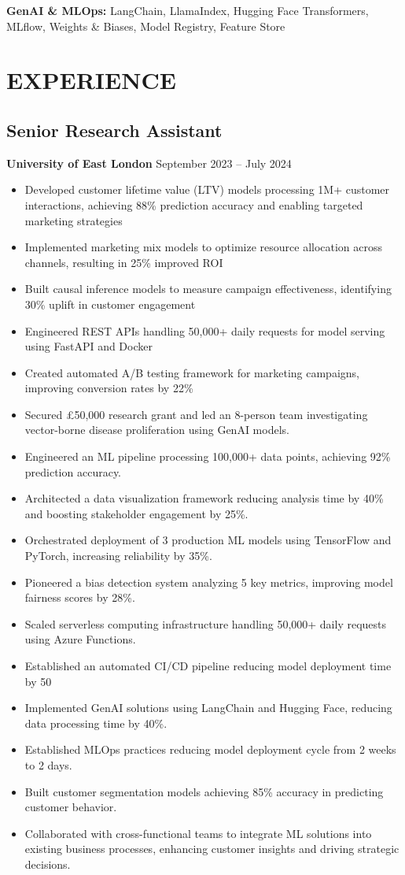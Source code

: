 \documentclass[10pt,a4paper]{article}
\begin{document}
\textbf{GenAI \& MLOps:} LangChain, LlamaIndex, Hugging Face Transformers, MLflow, Weights \& Biases, Model Registry, Feature Store

\section*{EXPERIENCE}

\subsection*{Senior Research Assistant}
\textbf{University of East London} \hfill September 2023 -- July 2024
\begin{itemize}
    \item Developed customer lifetime value (LTV) models processing 1M+ customer interactions, achieving 88\% prediction accuracy and enabling targeted marketing strategies
    \item Implemented marketing mix models to optimize resource allocation across channels, resulting in 25\% improved ROI
    \item Built causal inference models to measure campaign effectiveness, identifying 30\% uplift in customer engagement
    \item Engineered REST APIs handling 50,000+ daily requests for model serving using FastAPI and Docker
    \item Created automated A/B testing framework for marketing campaigns, improving conversion rates by 22\%
    \item Secured £50,000 research grant and led an 8-person team investigating vector-borne disease proliferation using GenAI models.
    \item Engineered an ML pipeline processing 100,000+ data points, achieving 92\% prediction accuracy.
    \item Architected a data visualization framework reducing analysis time by 40\% and boosting stakeholder engagement by 25\%.
    \item Orchestrated deployment of 3 production ML models using TensorFlow and PyTorch, increasing reliability by 35\%.
    \item Pioneered a bias detection system analyzing 5 key metrics, improving model fairness scores by 28\%.
    \item Scaled serverless computing infrastructure handling 50,000+ daily requests using Azure Functions.
    \item Established an automated CI/CD pipeline reducing model deployment time by 50%
    \item Implemented GenAI solutions using LangChain and Hugging Face, reducing data processing time by 40\%.
    \item Established MLOps practices reducing model deployment cycle from 2 weeks to 2 days.
    \item Built customer segmentation models achieving 85\% accuracy in predicting customer behavior.
    \item Collaborated with cross-functional teams to integrate ML solutions into existing business processes, enhancing customer insights and driving strategic decisions.
\end{itemize}
\end{document}
